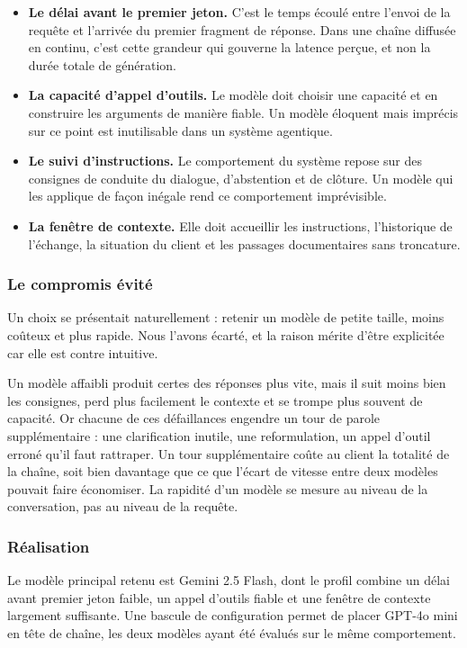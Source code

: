 \begin{itemize}
  \item \textbf{Le délai avant le premier jeton.} C'est le temps écoulé entre l'envoi de la requête et l'arrivée du premier fragment de réponse. Dans une chaîne diffusée en continu, c'est cette grandeur qui gouverne la latence perçue, et non la durée totale de génération.
  \item \textbf{La capacité d'appel d'outils.} Le modèle doit choisir une capacité et en construire les arguments de manière fiable. Un modèle éloquent mais imprécis sur ce point est inutilisable dans un système agentique.
  \item \textbf{Le suivi d'instructions.} Le comportement du système repose sur des consignes de conduite du dialogue, d'abstention et de clôture. Un modèle qui les applique de façon inégale rend ce comportement imprévisible.
  \item \textbf{La fenêtre de contexte.} Elle doit accueillir les instructions, l'historique de l'échange, la situation du client et les passages documentaires sans troncature.
\end{itemize}

\subsubsection{Le compromis évité}

Un choix se présentait naturellement : retenir un modèle de petite taille, moins coûteux et plus rapide. Nous l'avons écarté, et la raison mérite d'être explicitée car elle est contre intuitive.

Un modèle affaibli produit certes des réponses plus vite, mais il suit moins bien les consignes, perd plus facilement le contexte et se trompe plus souvent de capacité. Or chacune de ces défaillances engendre un tour de parole supplémentaire : une clarification inutile, une reformulation, un appel d'outil erroné qu'il faut rattraper. Un tour supplémentaire coûte au client la totalité de la chaîne, soit bien davantage que ce que l'écart de vitesse entre deux modèles pouvait faire économiser. La rapidité d'un modèle se mesure au niveau de la conversation, pas au niveau de la requête.

\subsubsection{Réalisation}

Le modèle principal retenu est Gemini 2.5 Flash, dont le profil combine un délai avant premier jeton faible, un appel d'outils fiable et une fenêtre de contexte largement suffisante. Une bascule de configuration permet de placer GPT-4o mini en tête de chaîne, les deux modèles ayant été évalués sur le même comportement.

